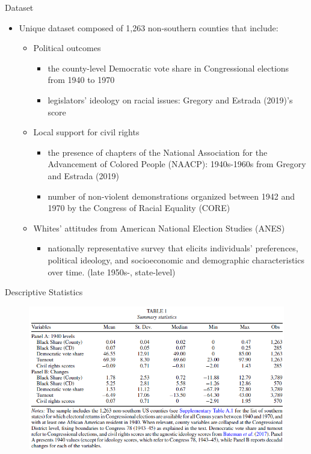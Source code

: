\documentclass[dvipdfmx,11pt]{beamer}
\begin{document}
\begin{frame}{Dataset}
  \begin{itemize}
    \item Unique dataset composed of 1,263 non-southern counties that include:
    \begin{itemize}
      \item Political outcomes
      \begin{itemize}
        \item the county-level Democratic vote share in Congressional elections from 1940 to 1970
        \item legislators' ideology on racial issues: Gregory and Estrada (2019)'s score
      \end{itemize}
      \item Local support for civil rights
      \begin{itemize}
        \item the presence of chapters of the National Association for the Advancement of Colored People (NAACP): 1940s-1960s from Gregory and Estrada (2019)
        \item number of non-violent demonstrations organized between 1942 and 1970 by the Congress of Racial Equality (CORE)
      \end{itemize}
      \item Whites' attitudes from American National Election Studies (ANES)
      \begin{itemize}
        \item nationally representative survey that elicits individuals' preferences, political ideology, and socioeconomic and demographic characteristics over time. (late 1950s-, state-level)
      \end{itemize}
    \end{itemize}
  \end{itemize}
\end{frame}

\begin{frame}{Descriptive Statistics}
  \begin{figure}
    \centering
    \includegraphics[scale = .5]{fig_tab/os20220708/T1.png}
  \end{figure}
\end{frame}
\end{document}
